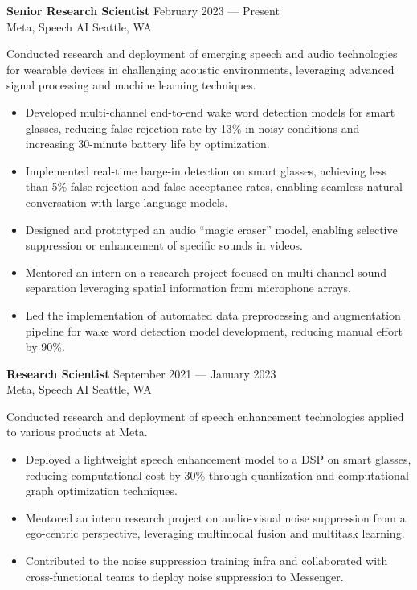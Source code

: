 \documentclass[a4paper,9pt]{extarticle} %
\begin{document}
\textbf{Senior Research Scientist} \hfill February 2023 --- Present \\
Meta, Speech AI \hfill Seattle, WA \\
\vspace{-1.5\parskip}

Conducted research and deployment of emerging speech and audio technologies for wearable devices in challenging acoustic environments, leveraging advanced signal processing and machine learning techniques.
\vspace{-.9\parskip}
\begin{itemize}[nosep]
  \item Developed multi-channel end-to-end wake word detection models for smart glasses, reducing false rejection rate by 13\% in noisy conditions and increasing 30-minute battery life by optimization.
  \item Implemented real-time barge-in detection on smart glasses, achieving less than 5\% false rejection and false acceptance rates, enabling seamless natural conversation with large language models.
  \item Designed and prototyped an audio ``magic eraser'' model, enabling selective suppression or enhancement of specific sounds in videos.
  \item Mentored an intern on a research project focused on multi-channel sound separation leveraging spatial information from microphone arrays.
  \item Led the implementation of automated data preprocessing and augmentation pipeline for wake word detection model development, reducing manual effort by 90\%.
\end{itemize}

\textbf{Research Scientist} \hfill September 2021 --- January 2023 \\
Meta, Speech AI \hfill Seattle, WA \\
\vspace{-1.5\parskip}

Conducted research and deployment of speech enhancement technologies applied to various products at Meta.
\vspace{-.9\parskip}
\begin{itemize}[nosep]
  \item Deployed a lightweight speech enhancement model to a DSP on smart glasses, reducing computational cost by 30\% through quantization and computational graph optimization techniques.
  \item Mentored an intern research project on audio-visual noise suppression from a ego-centric perspective, leveraging multimodal fusion and multitask learning.
  \item Contributed to the noise suppression training infra and collaborated with cross-functional teams to deploy noise suppression to Messenger.
\end{itemize}
\end{document}
